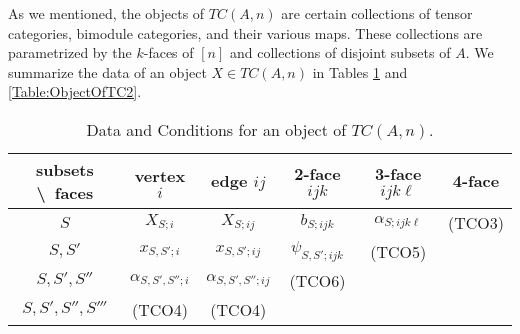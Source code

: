 \documentclass{amsart}
\begin{document}
As we mentioned, the objects of $TC(A,n)$ are certain collections of tensor categories, bimodule categories, and their various maps. These collections are parametrized by the $k$-faces of $[n]$ and collections of disjoint subsets of $A$. We summarize the data of an object $X \in TC(A,n)$ in Tables \ref{Table:ObjectOfTC} and \ref{Table:ObjectOfTC2}.
\begin{table}[ht]
	\caption{Data and Conditions for an object of $TC(A,n)$.}
	\begin{tabular}{c |ccccc}
	 subsets \textbackslash\ faces & vertex $i$ & edge $ij$ & 2-face $ijk$ & 3-face $ijk\ell$ & 4-face \\
	\hline
	$S$ 				& $X_{S;i}$ & $X_{S; ij}$ & $b_{S; ijk}$  & $\alpha_{S;ijk\ell}$ & (TCO3) \\
	$S, S'$ 			& $x_{S, S';i}$ & $x_{S, S';ij}$ & $\psi_{S, S'; i j k}$ & (TCO5) & \\
	$S, S', S''$ 		& $\alpha_{S, S', S'';i}$ & $\alpha_{S, S', S'';ij}$ & (TCO6) &  & \\
	\hline
	$S, S', S'', S''' $	& (TCO4) & (TCO4)  &  &  & \\
	\end{tabular}
	\label{Table:ObjectOfTC}
\end{table}	
\end{document}
